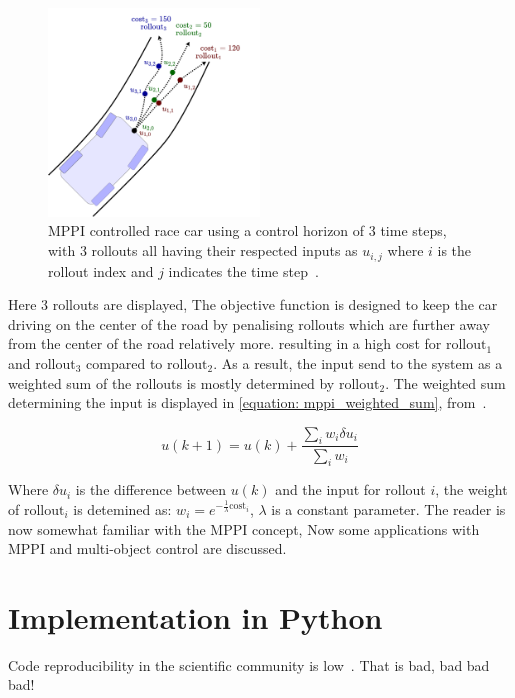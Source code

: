 \begin{figure}[h]
    \centering
    \includegraphics[width=0.5\textwidth]{figures/MPPI_car_with_rollouts.png}
    \caption{\acs{MPPI} controlled race car using a control horizon of 3 time steps, with 3 rollouts all having their respected inputs as $u_{i,j}$ where $i$ is the rollout index and $j$ indicates the time step~\cite{neuromorphictutorial_ltc21_2021}.}
    \label{figure: mppi_car_with_rollouts}
\end{figure}

Here 3 rollouts are displayed, The objective function is designed to keep the car driving on the center of the road by penalising rollouts which are further away from the center of the road relatively more. resulting in a high cost for $\text{rollout}_1$ and $\text{rollout}_3$ compared to $\text{rollout}_2$. As a result, the input send to the system as a weighted sum of the rollouts is mostly determined by $\text{rollout}_2$. The weighted sum determining the input is displayed in \cref{equation: mppi_weighted_sum}, from~\cite{neuromorphictutorial_ltc21_2021}.

\begin{equation}
u(k+1)=u(k)+\frac{\sum_{i} w_{i} \delta u_{i}}{\sum_{i} w_{i}}
\label{equation: mppi_weighted_sum}
\end{equation}

Where $\delta u_i$ is the difference between $u(k)$ and the input for rollout $i$, the weight of $\text{rollout}_i$ is detemined as: $w_{i}=e^{-\frac{1}{\lambda} \text{cost}_{i}}$, $\lambda$ is a constant parameter. The reader is now somewhat familiar with the \ac{MPPI} concept, Now some applications with \ac{MPPI} and multi-object control are discussed.\bs

\chapter{Implementation in Python}%
\label{chap:code_implementation}


Code reproducibility in the scientific community is low~\cite{trisovic_largescale_2022}. That is bad, bad bad bad!

